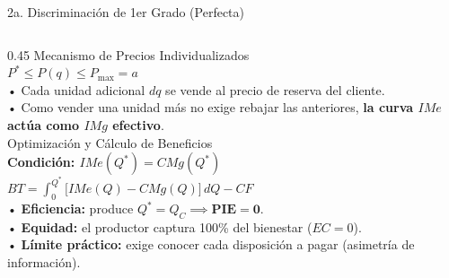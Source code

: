 \documentclass[aspectratio=169, 10pt]{beamer}
\begin{document}
\begin{frame}{2a. Discriminación de 1er Grado (Perfecta)}
\begin{columns}[T]
    \begin{column}{0.45\textwidth}
      {\scriptsize\color{grisTexto}Mecanismo de Precios Individualizados}\\[1pt]
      {\small\color{azulPrincipal}\textbf{\(P^* \le P(q) \le P_{\max} = a\)}}\\[2pt]
      {\scriptsize
        • Cada unidad adicional \(dq\) se vende al precio de reserva del cliente.\\
        • Como vender una unidad más no exige rebajar las anteriores, \textbf{la curva \(IMe\) actúa como \(IMg\) efectivo}.\\[4pt]
      }
      {\scriptsize\color{grisTexto}Optimización y Cálculo de Beneficios}\\[1pt]
      {\small\color{verdeAcento}\textbf{Condición: \(IMe(Q^*) = CMg(Q^*)\)}}\\[2pt]
      {\normalsize\color{azulOscuro}\textbf{\(BT = \int_0^{Q^*} \big[IMe(Q) - CMg(Q)\big]\,dQ - CF\)}}\\[3pt]
      {\scriptsize
        • \textbf{Eficiencia:} produce \(Q^* = Q_C \implies \mathbf{PIE = 0}\).\\
        • \textbf{Equidad:} el productor captura 100\% del bienestar (\(EC = 0\)).\\
        • \textbf{Límite práctico:} exige conocer cada disposición a pagar (asimetría de información).
      }
    \end{column}
  \end{columns}

\end{frame}
\end{document}
